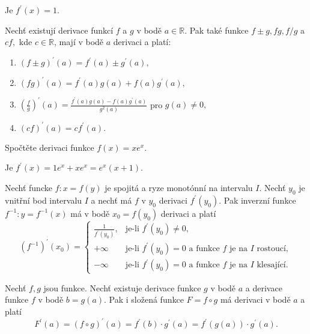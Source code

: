 \begin{reseni}
  Je $f^\prime(x)=1.$
\end{reseni}

\begin{veta}
Nechť existují derivace funkcí $f$ a $g$ v bodě $a\in \mathbb R.$ Pak
také funkce $f\pm g, fg, f/g$ a $cf,$ kde $c\in \mathbb R$, mají v bodě $a$ derivaci a platí:
\begin{enumerate}[$i.$]
\item $(f\pm g)^\prime (a) = f^\prime(a) \pm g^\prime(a),$
\item $(fg)^\prime (a) = f^\prime (a)g(a)+ f(a)g^\prime(a),$
\item $\left ( \frac{f}{g} \right )^\prime(a)=\frac{f^\prime (a)g(a)-f(a)g^\prime(a)}{g^2(a)} $ pro $g(a)\ne 0,$
\item $(cf)^\prime(a)=cf^\prime (a).$
\end{enumerate}
\end{veta}

\begin{priklad}
  Spočtěte derivaci funkce $f(x)=xe^x.$
\end{priklad}

\begin{reseni}
  Je $f^\prime(x)=1e^x+xe^x=e^x(x+1)$.
\end{reseni}

\begin{veta}
Nechť funcke $f:x=f(y)$ je spojitá a ryze monotónní na intervalu $I.$ Nechť $y_0$
je vnitřní bod intervalu $I$ a nechť má $f$ v $y_0$ derivaci $f^\prime(y_0).$
Pak inverzní funkce $f^{-1}:y=f^{-1}(x)$ má v bodě $x_0=f(y_0)$ derivaci a platí
$$
\left ( f^{-1} \right )^\prime(x_0)= \begin{cases}
\frac{1}{f^\prime(y_0)}, & \textrm{je-li } f^\prime(y_0)\ne 0,\\
+\infty & \textrm{je-li } f^\prime (y_0)=0 \textrm{ a funkce } f \textrm{ je na } I \textrm{ rostoucí},\\
-\infty & \textrm{je-li } f^\prime (y_0)=0 \textrm{ a funkce } f \textrm{ je na } I \textrm{ klesající}.
\end{cases}
$$
\end{veta}

\begin{veta}
Nechť $f, g$ jsou funkce. Nechť existuje derivace funkce $g$ v bodě $a$ a
derivace funkce $f$ v bodě $b=g(a).$ Pak i složená funkce $F=f\circ g$ má derivaci
v bodě $a$ a platí
$$F^\prime(a)=(f\circ g)^\prime (a) = f^\prime(b)\cdot g^\prime(a)=f^\prime(g(a))\cdot g^\prime(a).$$
\end{veta}

